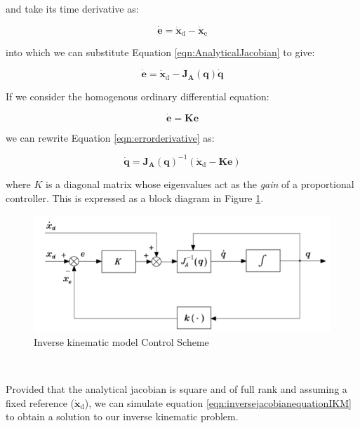\documentclass{UoNMCHA}
\numberwithin{equation}{section}
\begin{document}
and take its time derivative as:

\begin{equation}
	\mathbf{\dot{e}} = \mathrm{ \mathbf{\dot{x}}_d } - \mathrm{ \mathbf{\dot{x}}_e } 
\end{equation}

into which we can substitute Equation \ref{eqn:AnalyticalJacobian} to give:

\begin{equation}\label{eqn:errorderivative}
	\mathbf{\dot{e}} = \mathrm{ \mathbf{\dot{x}}_d } - \mathbf{J_A(q) \dot{q}}
\end{equation}

If we consider the homogenous ordinary differential equation:

\begin{equation}
	\mathbf{\dot{e}} = \mathbf{K e}
\end{equation}

 we can rewrite Equation \ref{eqn:errorderivative} as:

\begin{equation} \label{eqn:inversejacobianequationIKM}
\mathbf{\dot{q}} = \mathbf{J_A(q)}^{-1} (\mathrm{ \mathbf{\dot{x}}_d } - \mathbf{K e})
\end{equation}

where $K$ is a diagonal matrix whose eigenvalues act as the \textit{gain} of a proportional controller. This is expressed as a block diagram in Figure \ref{fig:ode}. \\

\begin{figure}[H]
	\begin{center}
		\includegraphics[width=.9\linewidth]{Figures/ode}
		\caption{Inverse kinematic model Control Scheme}
		\label{fig:ode}
	\end{center}
\end{figure}\

Provided that the analytical jacobian is square and of full rank and assuming a fixed reference ($\mathrm{ \mathbf{\dot{x}}_d }$), we can simulate equation \ref{eqn:inversejacobianequationIKM} to obtain a solution to our inverse kinematic problem.
\end{document}
